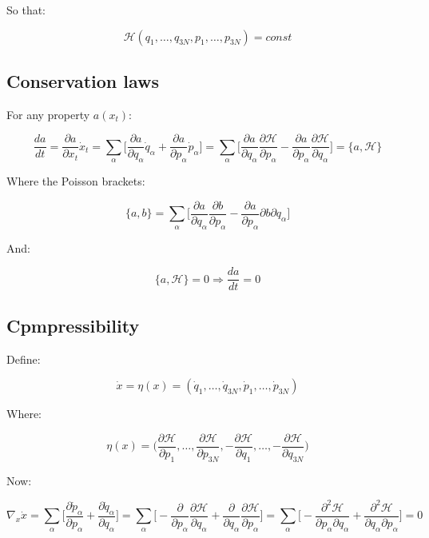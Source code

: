 	So that:

	$$\mathcal{H}(q_1, \dots, q_{3N}, p_1, \dots, p_{3N}) = const$$

	\subsection{Conservation laws}
	For any property $a(x_t)$:

	$$\frac{da}{dt} = \frac{\partial a}{\partial x_t} \dot{x}_t = \sum\limits_\alpha\biggl[\frac{\partial a}{\partial q_\alpha}\dot{q}_\alpha + \frac{\partial a}{\partial p_\alpha}\dot{p}_\alpha\biggr] = \sum\limits_\alpha\biggl[\frac{\partial a}{\partial q_\alpha}\frac{\partial\mathcal{H}}{\partial p_\alpha} - \frac{\partial a}{\partial p_\alpha}\frac{\partial\mathcal{H}}{\partial q_\alpha}\biggr] = \{a, \mathcal{H}\}$$

	Where the Poisson brackets:

	$$\{a, b\} = \sum\limits_\alpha\biggl[\frac{\partial a}{\partial q_\alpha}\frac{\partial b}{\partial p_\alpha} - \frac{\partial a}{\partial p_\alpha}{\partial b}{\partial q_\alpha}\biggr]$$

	And:

	$$\{a, \mathcal{H}\} = 0\Rightarrow\frac{da}{dt} = 0$$

	\subsection{Cpmpressibility}
	Define:

	$$\dot{x} = \eta(x) = (\dot{q}_1, \dots, \dot{q}_{3N}, \dot{p}_1, \dots, \dot{p}_{3N})$$

	Where:

	$$\eta(x) = \biggl(\frac{\partial\mathcal{H}}{\partial p_1}, \dots, \frac{\partial\mathcal{H}}{\partial p_{3N}}, -\frac{\partial\mathcal{H}}{\partial q_1}, \dots, -\frac{\partial\mathcal{H}}{\partial q_{3N}}\biggr)$$

	Now:

	$$\nabla_x\dot{x} = \sum\limits_\alpha\biggl[\frac{\partial\dot{p}_\alpha}{\partial p_\alpha} + \frac{\partial\dot{q}_\alpha}{\partial q_\alpha}\biggr] = \sum\limits_\alpha\biggl[-\frac{\partial}{\partial p_\alpha}\frac{\partial\mathcal{H}}{\partial q_\alpha} + \frac{\partial}{\partial q_\alpha}\frac{\partial\mathcal{H}}{\partial p_\alpha}\biggr] = \sum\limits_\alpha\biggl[-\frac{\partial^2\mathcal{H}}{\partial p_\alpha\partial q_\alpha} + \frac{\partial^2\mathcal{H}}{\partial q_\alpha\partial p_\alpha}\biggr] = 0$$

